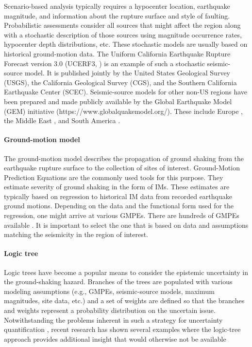 Scenario-based analysis typically requires a hypocenter location, earthquake magnitude, and information about the rupture surface and style of faulting. Probabilistic assessments consider all sources that might affect the region along with a stochastic description of those sources using magnitude occurrence rates, hypocenter depth distributions, etc. These stochastic models are usually based on historical ground-motion data. The Uniform California Earthquake Rupture Forecast version 3.0 (UCERF3, \cite{field2014uniform}) is an example of such a stochastic seismic-source model. It is published jointly by the United States Geological Survey (USGS), the California Geological Survey (CGS), and the Southern California Earthquake Center (SCEC). Seismic-source models for other non-US regions have been prepared and made publicly available by the Global Earthquake Model (GEM) initiative (https://www.globalquakemodel.org/). These include Europe \citep{giardini2014mapping}, the Middle East \citep{danciu20172014}, and South America \citep{garcia2018creation}.

\paragraph{Ground-motion model} The ground-motion model describes the propagation of ground shaking from the earthquake rupture surface to the collection of sites of interest. Ground-Motion Prediction Equations are the commonly used tools for this purpose. They estimate severity of ground shaking in the form of IMs. These estimates are typically based on regression to historical IM data from recorded earthquake ground motions. Depending on the data and the functional form used for the regression, one might arrive at various GMPEs. There are hundreds of GMPEs available \citep{douglas2018ground}. It is important to select the one that is based on data and assumptions matching the seismicity in the region of interest.

\paragraph{Logic tree} Logic trees have become a popular means to consider the epistemic uncertainty in the ground-shaking hazard. Branches of the trees are populated with various modeling assumptions (e.g., GMPEs, seismic-source models, maximum magnitudes, site data, etc.) and a set of weights are defined so that the branches and weights represent a probability distribution on the uncertain issue. Notwithstanding the problems inherent in such a strategy for uncertainty quantification \citep{bommer2008use}, recent research has shown several examples where the logic-tree approach provides additional insight that would otherwise not be available \citep[see e.g.,][]{goulet2017ngaeast}

